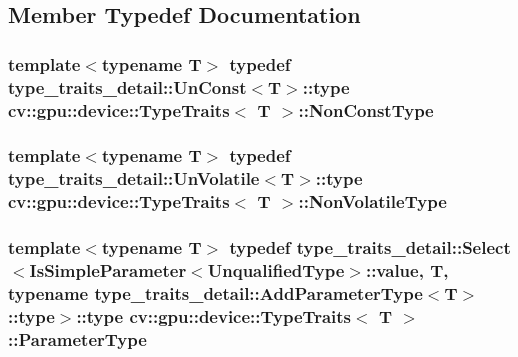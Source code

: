 \subsection{Member Typedef Documentation}
\hypertarget{structcv_1_1gpu_1_1device_1_1TypeTraits_a5eb017695f64e787767dd56e3c0c8ced}{
\subsubsection[{Non\-Const\-Type}]{\setlength{\rightskip}{0pt plus 5cm}template$<$typename T$>$ typedef {\bf type\-\_\-traits\-\_\-detail\-::\-Un\-Const}$<${\bf T}$>$\-::{\bf type} {\bf cv\-::gpu\-::device\-::\-Type\-Traits}$<$ {\bf T} $>$\-::{\bf Non\-Const\-Type}}}\label{structcv_1_1gpu_1_1device_1_1TypeTraits_a5eb017695f64e787767dd56e3c0c8ced}
\hypertarget{structcv_1_1gpu_1_1device_1_1TypeTraits_a1accc54314dac906cf94ca2664e2052c}{
\subsubsection[{Non\-Volatile\-Type}]{\setlength{\rightskip}{0pt plus 5cm}template$<$typename T$>$ typedef {\bf type\-\_\-traits\-\_\-detail\-::\-Un\-Volatile}$<${\bf T}$>$\-::{\bf type} {\bf cv\-::gpu\-::device\-::\-Type\-Traits}$<$ {\bf T} $>$\-::{\bf Non\-Volatile\-Type}}}\label{structcv_1_1gpu_1_1device_1_1TypeTraits_a1accc54314dac906cf94ca2664e2052c}
\hypertarget{structcv_1_1gpu_1_1device_1_1TypeTraits_a27a6644315cebcfdb7b02e65bf131658}{
\subsubsection[{Parameter\-Type}]{\setlength{\rightskip}{0pt plus 5cm}template$<$typename T$>$ typedef {\bf type\-\_\-traits\-\_\-detail\-::\-Select}$<${\bf Is\-Simple\-Parameter}$<${\bf Unqualified\-Type}$>$\-::{\bf value}, {\bf T}, typename {\bf type\-\_\-traits\-\_\-detail\-::\-Add\-Parameter\-Type}$<${\bf T}$>$\-::{\bf type}$>$\-::{\bf type} {\bf cv\-::gpu\-::device\-::\-Type\-Traits}$<$ {\bf T} $>$\-::{\bf Parameter\-Type}}}\label{structcv_1_1gpu_1_1device_1_1TypeTraits_a27a6644315cebcfdb7b02e65bf131658}
